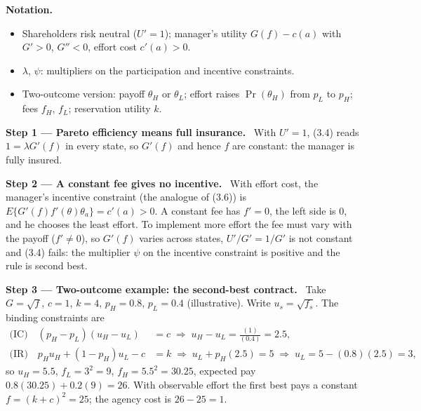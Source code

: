 \documentclass[11pt,a4paper]{article}
\newcommand{\notation}{\par\noindent\textbf{Notation.}}
\newcommand{\step}[2]{\par\medskip\noindent\textbf{Step #1 --- #2.}~}
\begin{document}
\notation
\begin{itemize}
  \item Shareholders risk neutral ($U'=1$); manager's utility $G(f)-c(a)$ with $G'>0$, $G''<0$, effort cost $c'(a)>0$.
  \item $\lambda$, $\psi$: multipliers on the participation and incentive constraints.
  \item Two-outcome version: payoff $\theta_H$ or $\theta_L$; effort raises $\Pr(\theta_H)$ from $p_L$ to $p_H$; fees $f_H$, $f_L$; reservation utility $k$.
\end{itemize}

\step{1}{Pareto efficiency means full insurance} With $U'=1$, (3.4) reads $1=\lambda G'(f)$ in every state, so $G'(f)$ and hence $f$ are constant: the manager is fully insured.

\step{2}{A constant fee gives no incentive} With effort cost, the manager's incentive constraint (the analogue of (3.6)) is $E\{G'(f)f'(\theta)\theta_a\}=c'(a)>0$. A constant fee has $f'=0$, the left side is 0, and he chooses the least effort. To implement more effort the fee must vary with the payoff ($f'\ne0$), so $G'(f)$ varies across states, $U'/G'=1/G'$ is not constant and (3.4) fails: the multiplier $\psi$ on the incentive constraint is positive and the rule is second best.

\step{3}{Two-outcome example: the second-best contract} Take $G=\sqrt f$, $c=1$, $k=4$, $p_H=0.8$, $p_L=0.4$ (illustrative). Write $u_s=\sqrt{f_s}$. The binding constraints are
\begin{align}
  \text{(IC)}\quad (p_H-p_L)(u_H-u_L) &= c \;\Rightarrow\; u_H-u_L = \frac{(1)}{(0.4)} = 2.5, \label{r8be14-ic}\\
  \text{(IR)}\quad p_Hu_H+(1-p_H)u_L - c &= k \;\Rightarrow\; u_L + p_H(2.5) = 5 \;\Rightarrow\; u_L = 5-(0.8)(2.5) = 3, \label{r8be14-ir}
\end{align}
so $u_H=5.5$, $f_L=3^2=9$, $f_H=5.5^2=30.25$, expected pay $0.8(30.25)+0.2(9)=26$. With observable effort the first best pays a constant $f=(k+c)^2=25$; the agency cost is $26-25=1$.
\end{document}
